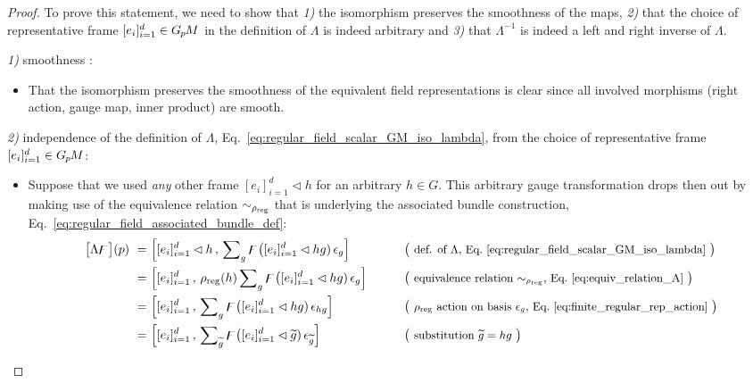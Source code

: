 \begin{proof}
    To prove this statement, we need to show that
    \textit{1)} the isomorphism preserves the smoothness of the maps,
    \textit{2)} that the choice of representative frame $[e_i]_{i=1}^d \in G_{\mkern-1.3mu p}\mkern-1.2muM$ in the definition of $\Lambda$ is indeed arbitrary and
    \textit{3)} that $\Lambda^{-1}$ is indeed a left and right inverse of $\Lambda$.

    \item[] {\textit{1)} smoothness : }
    \begin{itemize}[leftmargin=1.1cm]
    \setlength\itemsep{2ex}
        \item[]
        That the isomorphism preserves the smoothness of the equivalent field representations is clear since all involved morphisms (right action, gauge map, inner product) are smooth.
    \end{itemize}

    \item[] {\textit{2)} independence of the definition of $\Lambda$, Eq.~\eqref{eq:regular_field_scalar_GM_iso_lambda}, from the choice of representative frame ${[e_i]_{i=1}^d \in G_{\mkern-1.3mu p}\mkern-1.2muM}$: }
    \begin{itemize}[leftmargin=1.1cm]
    \setlength\itemsep{2ex}
        \item[]
        Suppose that we used \emph{any} other frame $[e_i]_{i=1}^d \lhd h$ for an arbitrary $h\in G$.
        This arbitrary gauge transformation drops then out by making use of the equivalence relation $\sim_{\rho_\textup{reg}}$ that is underlying the associated bundle construction, Eq.~\eqref{eq:regular_field_associated_bundle_def}:
        \begin{alignat}{3}
            \big[\Lambda\digamma\big](p)
            \ =&\ \Big[ [e_i]_{i=1}^d \lhd h \,,\, \sum\nolimits_g \digamma\big( [e_i]_{i=1}^d \lhd hg)\, \epsilon_g \Big]
                \qquad && \big( \text{\small def. of $\Lambda$, Eq.~\eqref{eq:regular_field_scalar_GM_iso_lambda} } \big) \notag\\
            \ =&\ \Big[ [e_i]_{i=1}^d \,,\, \rho_\textup{reg}(h) \sum\nolimits_g \digamma\big( [e_i]_{i=1}^d \lhd hg)\, \epsilon_g \Big]
                \qquad && \big( \text{\small equivalence relation $\sim_{\rho_\textup{reg}}$, Eq.~\eqref{eq:equiv_relation_A} } \big) \notag\\
            \ =&\ \Big[ [e_i]_{i=1}^d \,,\, \sum\nolimits_g \digamma\big( [e_i]_{i=1}^d \lhd hg)\, \epsilon_{hg} \Big]
                \qquad && \big( \text{\small $\rho_{\textup{reg}}$ action on basis $\epsilon_g$, Eq.~\eqref{eq:finite_regular_rep_action} } \big) \notag\\
            \ =&\ \Big[ [e_i]_{i=1}^d \,,\, \sum\nolimits_{\widetilde{g}} \digamma\big( [e_i]_{i=1}^d \lhd \widetilde{g})\, \epsilon_{\widetilde{g}} \Big]
                \qquad && \big( \text{\small substitution $\widetilde{g} = hg$ } \big)
        \end{alignat}
    \end{itemize}


\end{proof}
